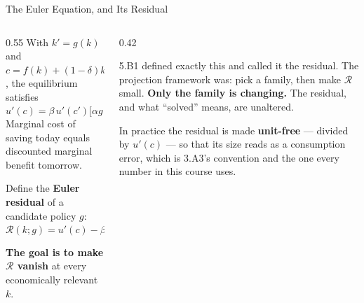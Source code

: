 \begin{frame}{The Euler Equation, and Its Residual}
\begin{columns}[T]
\begin{column}{0.55\textwidth}
\small
With $k'=g(k)$ and $c=f(k)+(1-\delta)k-g(k)$, the equilibrium satisfies
\[
  u'(c)=\beta\,u'(c')\bigl[\alpha g(k)^{\alpha-1}+1-\delta\bigr].
\tag{EE}
\]
Marginal cost of saving today equals discounted marginal benefit tomorrow.
\medskip

Define the \textbf{Euler residual} of a candidate policy $g$:
\[
  \mathcal{R}(k;g)=u'(c)-\beta u'(c')\bigl[\alpha g(k)^{\alpha-1}+1-\delta\bigr].
\]
\medskip

\textbf{The goal is to make $\mathcal{R}$ vanish} at every economically relevant $k$.
\end{column}
\begin{column}{0.42\textwidth}
\begin{takeawaybox}[title=\textbf{You have met this object}]\small
5.B1 defined exactly this and called it the residual. The projection framework was: pick a family, then make $\mathcal{R}$ small.
\medskip
\textbf{Only the family is changing.} The residual, and what ``solved'' means, are unaltered.
\end{takeawaybox}
\medskip
\begin{examplebox}\footnotesize
In practice the residual is made \textbf{unit-free} --- divided by $u'(c)$ --- so that its size reads as a consumption error, which is 3.A3's convention and the one every number in this course uses.
\end{examplebox}
\end{column}
\end{columns}
\end{frame}

